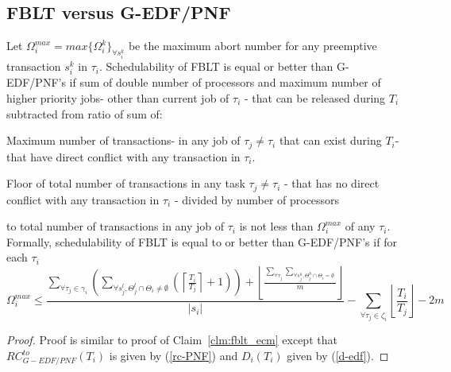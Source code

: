 \subsection{FBLT versus G-EDF/PNF}\label{subsec:fblt_vs_gedf_pnf}
%
\begin{clm}\label{clm:fblt_pnf_edf}
%
Let $\Omega_i^{max}=max\{\Omega_i^k\}_{\forall s_i^k}$ be the maximum abort number for any preemptive transaction $s_i^k$ in $\tau_i$. Schedulability of FBLT is equal or better than G-EDF/PNF's if sum of double number of processors and maximum number of higher priority jobs- other than current job of $\tau_i$ - that can be released during $T_i$ subtracted from ratio of sum of:
%
\begin{compactitem}
\item Maximum number of transactions- in any job of $\tau_j \neq \tau_i$ that can exist during $T_i$- that have direct conflict with any transaction in $\tau_i$.
\item Floor of total number of transactions in any task $\tau_{j}\neq\tau_{i}$ - that has no direct conflict with any transaction in $\tau_{i}$ - divided by number of processors
\end{compactitem}
%
to total number of transactions in any job of $\tau_i$ is not less than $\Omega_i^{max}$ of any $\tau_i$. Formally, schedulability of FBLT is equal to or better than G-EDF/PNF's if for each $\tau_i$ 
%
\begin{equation}
\Omega_{i}^{max}
\le \frac{\sum_{\forall\tau_{j}\in\gamma_{i}}\left(\sum_{\forall s_{j}^{l},\Theta_{j}^{l}\cap\Theta_{i}\neq\emptyset}\left(\left\lceil \frac{T_{i}}{T_{j}}\right\rceil +1\right)\right)+\left\lfloor \frac{\sum_{\forall\tau_{j}}\sum_{\forall s_{j}^{h},\Theta_{j}^{h}\cap\Theta_{i}=\emptyset}}{m}\right\rfloor }{|s_{i}|}-\sum_{\forall\tau_{j}\in\zeta_{i}}\left\lfloor \frac{T_{i}}{T_{j}}\right\rfloor -2m
\label{eq:fblt_vs_gedf_pnf_3}
\end{equation}
%
\end{clm}
%
\begin{proof}
%
Proof is similar to proof of Claim~\ref{clm:fblt_ecm} except that $RC_{G-EDF/PNF}^{to}(T_i)$ is given by (\ref{rc-PNF}) and $D_i(T_i)$ given by (\ref{d-edf}).
%
\end{proof}
%

